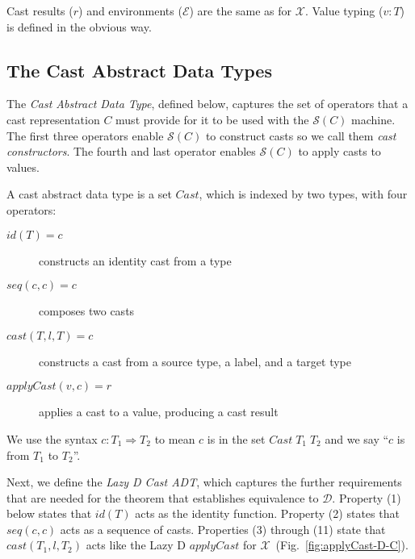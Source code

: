 \documentclass[acmsmall,review]{acmart}\settopmatter{printfolios=true,printccs=false,printacmref=false}
\newcommand{\judgeType}[2]{#1 : #2}
\newcommand{\POOprod}[2]{#1 \times #2}
\newcommand{\cOOcast}[3]{#1 \Rightarrow^{#2} #3}
\newcommand{\vOOcast}[2]{#1\langle#2\rangle}
\newcommand{\hcvOOcons}[4]{\mathtt{cons}\;#1\langle#2\rangle\;#3\langle#4\rangle}
\newcommand{\ineffCEK}{\ensuremath{\mathcal{X}}}
\newcommand{\ineffCEKD}{\ensuremath{\mathcal{D}}}
\newcommand{\effCEK}[1]{\ensuremath{\mathcal{S}(#1)}}
\begin{document}

Cast results ($r$) and environments ($\mathcal{E}$) are the same as for 
\ineffCEK. 
Value typing ($\judgeType{v}{T}$) is defined in the obvious way.

\subsection{The Cast Abstract Data Types}
\label{sec:framework:adt}

The \emph{Cast Abstract Data Type}, defined below, captures the set of
operators that a cast representation $C$ must provide for it to be
used with the \effCEK{C} machine.  The first three operators enable
\effCEK{C} to construct casts so we call them \textit{cast
  constructors}. The fourth and last operator enables \effCEK{C} to
apply casts to values.

\begin{definition}
  \label{def:cast-rep}
  A cast abstract data type is a set $Cast$, which is indexed by two types, 
  with four operators:
  \begin{description}
  \item[$id(T)=c$] constructs an identity cast from a type
  \item[$seq(c,c)=c$] composes two casts
  \item[$cast(T,l,T)=c$] constructs a cast from a source type, a label, and a 
  target type
  \item[$applyCast(v,c)=r$] applies a cast to a value, producing a cast result
  \end{description}
  We use the syntax $c : T_1 \Longrightarrow T_2$ to mean $c$ is in the set $Cast \; T_1 \; T_2$
  and we say ``$c$ is from $T_1$ to $T_2$''.
\end{definition}

Next, we define the \emph{Lazy D Cast ADT}, which captures the further
requirements that are needed for the theorem that establishes
equivalence to \ineffCEKD{}. Property (1) below states that $id(T)$
acts as the identity function. Property (2) states that $seq(c,c)$
acts as a sequence of casts. Properties (3) through (11) state that
$cast(T_1,l,T_2)$ acts like the Lazy D $applyCast$ for \ineffCEK\
(Fig.~\ref{fig:applyCast-D-C}).
\end{document}
